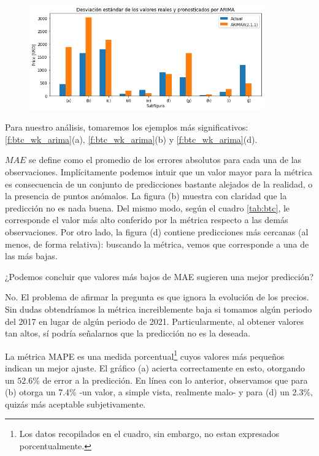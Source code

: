 \documentclass[a4paper,10pt]{article}
\begin{document}
\begin{figure}[H]
\centering
\includegraphics[width=0.9\textwidth]{./plots/arima/plots_btc_random_weekly/std}
\label{f:btc_std_wk}
\end{figure}


Para nuestro análisis, tomaremos los ejemplos más significativos: \ref{f:btc_wk_arima}(a), \ref{f:btc_wk_arima}(b) y \ref{f:btc_wk_arima}(d).

$MAE$ se define como el promedio de los errores absolutos para cada una de las observaciones. Implícitamente podemos intuir que un valor mayor para la métrica es consecuencia de un conjunto de predicciones bastante alejados de la realidad, o la presencia de puntos anómalos. La figura (b) muestra con claridad que la predicción no es nada buena. Del mismo modo, según el cuadro \ref{tab:btc}, le corresponde el valor más alto conferido por la métrica respecto a las demás observaciones. Por otro lado, la figura (d) contiene predicciones más cercanas (al menos, de forma relativa): buscando la métrica, vemos que corresponde a una de las más bajas.

¿Podemos concluir que valores más bajos de MAE sugieren una mejor predicción?

No. El problema de afirmar la pregunta es que ignora la evolución de los precios. Sin dudas obtendríamos la métrica increiblemente baja si tomamos algún periodo del 2017 en lugar de algún periodo de 2021. Particularmente, al obtener valores tan altos, sí podría señalarnos que la predicción no es la deseada.

La métrica MAPE es una medida porcentual\footnote{Los datos recopilados en el cuadro, sin embargo, no estan expresados porcentualmente.} cuyos valores más pequeños indican un mejor ajuste. El gráfico (a) acierta correctamente en esto, otorgando un $52.6\%$ de error a la predicción. En línea con lo anterior, observamos que para (b) otorga un 7.4\% -un valor, a simple vista, realmente malo- y para (d) un 2.3\%, quizás más aceptable subjetivamente.
\end{document}
